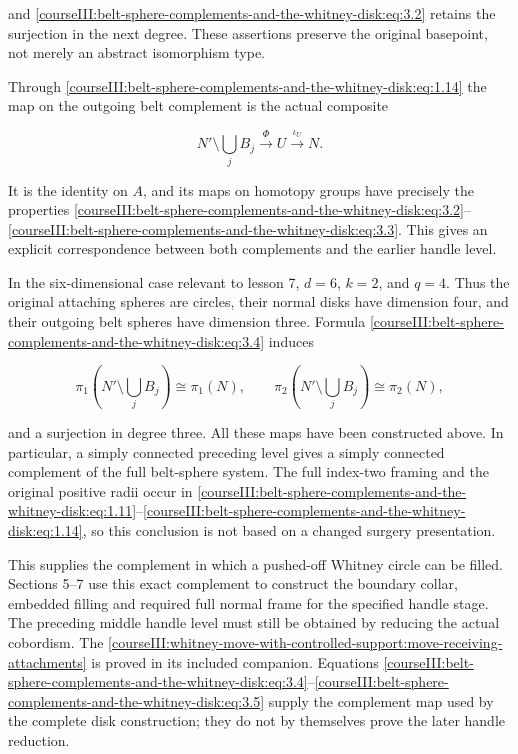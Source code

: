 and \eqref{courseIII:belt-sphere-complements-and-the-whitney-disk:eq:3.2} retains the surjection in the next degree. These assertions preserve the original basepoint, not merely an abstract isomorphism type.

Through \eqref{courseIII:belt-sphere-complements-and-the-whitney-disk:eq:1.14} the map on the outgoing belt complement is the actual composite

\begin{equation}
N'\setminus\bigcup_jB_j
\xrightarrow{\Phi}U
\xrightarrow{\iota_U}N.
\label{courseIII:belt-sphere-complements-and-the-whitney-disk:eq:3.4}
\end{equation}

It is the identity on \(A\), and its maps on homotopy groups have precisely the properties \eqref{courseIII:belt-sphere-complements-and-the-whitney-disk:eq:3.2}--\eqref{courseIII:belt-sphere-complements-and-the-whitney-disk:eq:3.3}. This gives an explicit correspondence between both complements and the earlier handle level.

In the six-dimensional case relevant to lesson 7, \(d=6\), \(k=2\), and \(q=4\). Thus the original attaching spheres are circles, their normal disks have dimension four, and their outgoing belt spheres have dimension three. Formula \eqref{courseIII:belt-sphere-complements-and-the-whitney-disk:eq:3.4} induces

\begin{equation}
\pi_1\!\left(N'\setminus\bigcup_jB_j\right)\cong\pi_1(N),
\qquad
\pi_2\!\left(N'\setminus\bigcup_jB_j\right)\cong\pi_2(N),
\label{courseIII:belt-sphere-complements-and-the-whitney-disk:eq:3.5}
\end{equation}

and a surjection in degree three. All these maps have been constructed above. In particular, a simply connected preceding level gives a simply connected complement of the full belt-sphere system. The full index-two framing and the original positive radii occur in \eqref{courseIII:belt-sphere-complements-and-the-whitney-disk:eq:1.11}--\eqref{courseIII:belt-sphere-complements-and-the-whitney-disk:eq:1.14}, so this conclusion is not based on a changed surgery presentation.

This supplies the complement in which a pushed-off Whitney circle can be filled. Sections 5--7 use this exact complement to construct the boundary collar, embedded filling and required full normal frame for the specified handle stage. The preceding middle handle level must still be obtained by reducing the actual cobordism. The \cref{courseIII:whitney-move-with-controlled-support:move-receiving-attachments} is proved in its included companion. Equations \eqref{courseIII:belt-sphere-complements-and-the-whitney-disk:eq:3.4}--\eqref{courseIII:belt-sphere-complements-and-the-whitney-disk:eq:3.5} supply the complement map used by the complete disk construction; they do not by themselves prove the later handle reduction.


